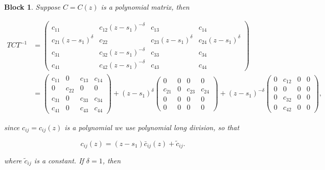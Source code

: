 \documentclass[12pt]{article}
\newtheorem{block}{Block}
\begin{document}
\begin{block}
Suppose $C = C(z)$ is a polynomial matrix, then

\[
    \begin{aligned}
    T C T^{-1} &= \begin{pmatrix}
        c_{11} & c_{12} (z-s_1)^{-\delta} & c_{13} & c_{14} \\[10pt]
        c_{21}(z-s_1)^\delta & c_{22} & c_{23} (z-s_1)^\delta & c_{24} (z-s_1)^\delta\\[10pt]
        c_{31} & c_{32} (z-s_1)^{-\delta} & c_{33} & c_{34} \\[10pt]
        c_{41} & c_{42} (z-s_1)^{-\delta} & c_{43} & c_{44}
    \end{pmatrix}
    \\ &=
    \begin{pmatrix}
        c_{11} & 0 & c_{13} & c_{14} \\[10pt]
        0 & c_{22} & 0 & 0 \\[10pt]
        c_{31} & 0 & c_{33} & c_{34} \\[10pt]
        c_{41} & 0 & c_{43} & c_{44}
    \end{pmatrix}
    +(z-s_1)^\delta\begin{pmatrix}
        0 & 0 & 0 & 0 \\[10pt]
        c_{21} & 0 & c_{23} & c_{24} \\[10pt]
        0 & 0 & 0 & 0 \\[10pt]
        0 & 0 & 0 & 0
    \end{pmatrix}
    +(z-s_1)^{-\delta} \begin{pmatrix}
        0 & c_{12}  & 0 & 0 \\[10pt]
        0 & 0 & 0 & 0 \\[10pt]
        0 & c_{32} & 0 & 0 \\[10pt]
        0 & c_{42} & 0 & 0
    \end{pmatrix},
    \end{aligned}
\]

since $c_{ij} = c_{ij}(z)$ is a polynomial we use polynomial long division, so that

\[
    c_{ij}(z) = (z-s_1) \bar{c}_{ij}(z) + \tilde{c}_{ij}.
\]

where $\tilde{c}_{ij}$ is a constant. If $\delta = 1$, then



\end{block}
\end{document}
